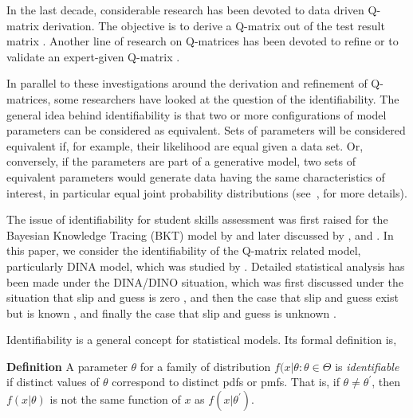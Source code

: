 \documentclass{edm_template}
\begin{document}
In the last decade, considerable research has been devoted to data driven Q-matrix derivation.  The objective is to derive a Q-matrix out of the test result matrix \cite{barnes2010novel, liu2012data, desmarais2015combining, xu2016boosted}.  Another line of research on Q-matrices has been devoted to refine or to validate an expert-given Q-matrix \cite{de2015general, chiu2013statistical, desmarais2013matrix}.

In parallel to these investigations around the derivation and refinement of Q-matrices, some researchers have looked at the question of the identifiability.  The general idea behind identifiability is that two or more configurations of model parameters can be considered as equivalent.  Sets of parameters will be considered equivalent if, for example, their likelihood are equal given a data set.  Or, conversely, if the parameters are part of a generative model, two sets of equivalent parameters would generate data having the same characteristics of interest, in particular equal joint probability distributions (see~, for more details).

The issue of identifiability for student skills assessment was first raised for the Bayesian Knowledge Tracing (BKT) model by  and later discussed by , and .  In this paper, we consider the identifiability of the Q-matrix related model, particularly DINA model, which was studied by  .  Detailed statistical analysis has been made under the DINA/DINO situation, which was first discussed under the situation that slip and guess is zero \cite{chiu2009cluster}, and then the case that slip and guess exist but is known \cite{liu2013theory}, and finally the case that slip and guess is unknown \cite{chen2015statistical}. 


Identifiability is a general concept for statistical models. Its formal definition is,

\textbf{Definition} \cite{casella2002statistical} A parameter $\theta$ for a family of distribution ${f(x|\theta: \theta \in \Theta}$ is \textit{identifiable} if distinct values of $\theta$ correspond to distinct pdfs or pmfs. That is, if $\theta \neq \theta^{\prime}$, then $f(x|\theta)$ is not the same function of $x$ as $f(x|\theta^{\prime})$.
\end{document}
